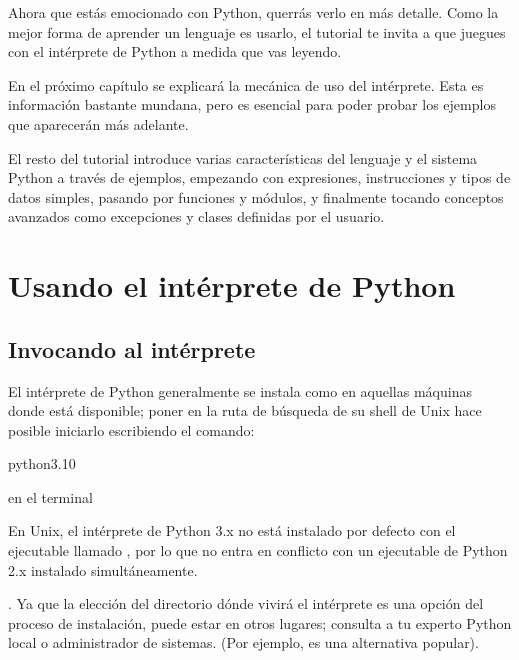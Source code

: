 \documentclass[a5paper,10pt,spanish]{sphinxmanual}
\begin{document}
\sphinxAtStartPar
Ahora que estás emocionado con Python, querrás verlo en más detalle. Como la mejor forma de aprender un lenguaje es usarlo, el tutorial te invita a que juegues con el intérprete de Python a medida que vas leyendo.

\sphinxAtStartPar
En el próximo capítulo se explicará la mecánica de uso del intérprete. Esta es información bastante mundana, pero es esencial para poder probar los ejemplos que aparecerán más adelante.

\sphinxAtStartPar
El resto del tutorial introduce varias características del lenguaje y el sistema Python a través de ejemplos, empezando con expresiones, instrucciones y tipos de datos simples, pasando por funciones y módulos, y finalmente tocando conceptos avanzados como excepciones y clases definidas por el usuario.


\chapter{Usando el intérprete de Python}
\label{\detokenize{tutorial/interpreter:using-the-python-interpreter}}\label{\detokenize{tutorial/interpreter:tut-using}}\label{\detokenize{tutorial/interpreter::doc}}

\section{Invocando al intérprete}
\label{\detokenize{tutorial/interpreter:invoking-the-interpreter}}\label{\detokenize{tutorial/interpreter:tut-invoking}}
\sphinxAtStartPar
El intérprete de Python generalmente se instala como  en aquellas máquinas donde está disponible; poner  en la ruta de búsqueda de su shell de Unix hace posible iniciarlo escribiendo el comando:

\begin{sphinxVerbatim}[commandchars=\\\{\}]
python3.10
\end{sphinxVerbatim}

\sphinxAtStartPar
en el terminal %
\begin{footnote}[1]\sphinxAtStartFootnote
En Unix, el intérprete de Python 3.x no está instalado por defecto con el ejecutable llamado , por lo que no entra en conflicto con un ejecutable de Python 2.x instalado simultáneamente.
%
\end{footnote}. Ya que la elección del directorio dónde vivirá el intérprete es una opción del proceso de instalación, puede estar en otros lugares; consulta a tu experto Python local o administrador de sistemas. (Por ejemplo,  es una alternativa popular).
\end{document}
